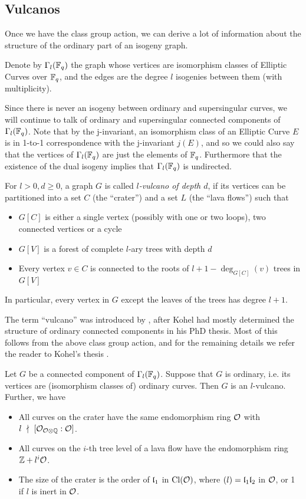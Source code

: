 \subsection{Vulcanos}
Once we have the class group action, we can derive a lot of information about the structure of the ordinary part of an isogeny graph.
\begin{definition}
    Denote by $\Gamma_l(\mathbb{F}_q)$ the graph whose vertices are isomorphism classes of Elliptic Curves over $\mathbb{F}_q$, and the edges are the degree $l$ isogenies between them (with multiplicity).
\end{definition}
Since there is never an isogeny between ordinary and supersingular curves, we will continue to talk of ordinary and supersingular connected components of $\Gamma_l(\mathbb{F}_q)$.
Note that by the j-invariant, an isomorphism class of an Elliptic Curve $E$ is in 1-to-1 correspondence with the j-invariant $j(E)$, and so we could also say that the vertices of $\Gamma_l(\mathbb{F}_q)$ are just the elements of $\mathbb{F}_q$.
Furthermore that the existence of the dual isogeny implies that $\Gamma_l(\mathbb{F}_q)$ is undirected.
\begin{definition}
    For $l > 0, d \geq 0$, a graph $G$ is called \emph{$l$-vulcano of depth $d$}, if its vertices can be partitioned into a set $C$ (the ``crater'') and a set $L$ (the ``lava flows'') such that
    \begin{itemize}
        \item $G[C]$ is either a single vertex (possibly with one or two loops), two connected vertices or a cycle
        \item $G[V]$ is a forest of complete $l$-ary trees with depth $d$
        \item Every vertex $v \in C$ is connected to the roots of $l + 1 - \deg_{G[C]}(v)$ trees in $G[V]$
    \end{itemize}
    In particular, every vertex in $G$ except the leaves of the trees has degree $l + 1$.
\end{definition}
The term ``vulcano'' was introduced by \cite{isogeny_vulcano}, after Kohel had mostly determined the structure of ordinary connected components in his PhD thesis.
Most of this follows from the above class group action, and for the remaining details we refer the reader to Kohel's thesis \cite[Prop.~23]{kohel}.
\begin{theorem}
    \label{prop:isogeny_vulcano}
    Let $G$ be a connected component of $\Gamma_l(\mathbb{F}_q)$.
    Suppose that $G$ is ordinary, i.e. its vertices are (isomorphism classes of) ordinary curves.
    Then $G$ is an $l$-vulcano.
    Further, we have
    \begin{itemize}
        \item All curves on the crater have the same endomorphism ring $\mathcal{O}$ with $l \ \nmid \  [\mathcal{O}_{\mathcal{O} \otimes \mathbb{Q}} : \mathcal{O}]$.
        \item All curves on the $i$-th tree level of a lava flow have the endomorphism ring $\mathbb{Z} + l^i\mathcal{O}$.
        \item The size of the crater is the order of $\mathfrak{l}_1$ in $\mathrm{Cl}(\mathcal{O})$, where $(l) = \mathfrak{l}_1\mathfrak{l}_2$ in $\mathcal{O}$, or 1 if $l$ is inert in $\mathcal{O}$.
    \end{itemize} 
\end{theorem}

